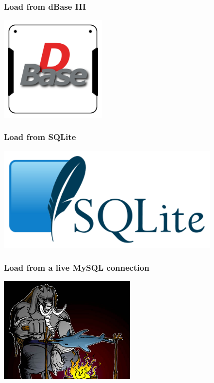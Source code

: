 \documentclass{beamer}
\begin{document}
\begin{frame}
  \frametitle{Load from dBase III}


  \begin{center}
    \includegraphics[height=2.1in]{dBase.png}
  \end{center}
\end{frame}

\begin{frame}
  \frametitle{Load from SQLite}


  \begin{center}
    \includegraphics[height=2.1in]{SQLite.png}
  \end{center}
\end{frame}

\begin{frame}
  \frametitle{Load from a live MySQL connection}


  \begin{center}
    \includegraphics[height=2.1in]{postgresql_versus_mysql.jpg}
  \end{center}
\end{frame}
\end{document}

